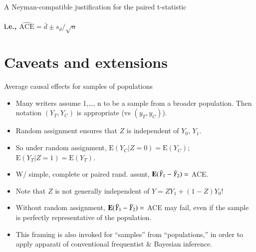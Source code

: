 
\begin{frame}{A Neyman-compatible justification for the paired t-statistic}
 \framesubtitle{i.e., $\widehat{\mathrm{ACE}} = \bar{d} \pm s_{d}/\sqrt{n}$} 

\end{frame}

\section{Caveats and extensions}



\begin{frame}{Average causal effects for samples of populations}
  
  \begin{itemize}
  \item Many writers assume 1,\ldots, n to be a sample from a
  broader population. Then notation $(Y_{T}, Y_{C})$ is appropriate
  (vs $(y_{T}, y_{C})$). 
  \item Random assignment ensures that $Z$ is independent of $Y_0$, $Y_1$.
  \item So under random assignment, $\mathrm{E}(Y_C|Z=0) =
  \mathrm{E}(Y_C)$;  $\mathrm{E}(Y_T|Z=1) = \mathrm{E}(Y_T)$.
  \item W/ simple, complete or paired rand. assmt, $\mathbf{E}( \bar{Y}_{1}
  - \bar{Y}_{2}) = $ ACE. 
  \item Note that $Z$ is not generally independent of $Y=ZY_1 +
  (1-Z)Y_0$!
  \item Without random assignment, $\mathbf{E}( \bar{Y}_{1}
  - \bar{Y}_{2}) = $ ACE may fail, even if the sample is perfectly
  representative of the population.
\item This framing is also invoked for ``samples'' from
  ``populations,'' in order to apply apparati of conventional
  frequentist \& Bayesian inference.
  \end{itemize}
\end{frame}

